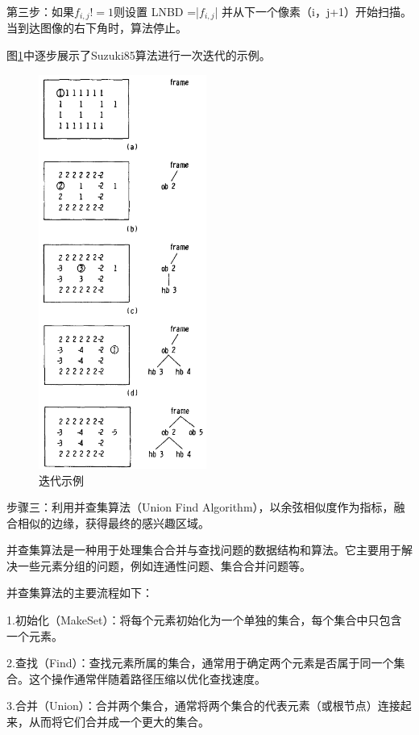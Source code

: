 第三步：如果$f_{i,j}!=1$则设置 LNBD =|$f_{i,j}$| 并从下一个像素（i，j+1）开始扫描。当到达图像的右下角时，算法停止。

图\ref{19}中逐步展示了Suzuki85算法进行一次迭代的示例。
\begin{figure}[ht]
    \centering
    \includegraphics[width=0.49\textwidth]{figures/algorithm_example.png}
    \caption{迭代示例}
    \label{19}
\end{figure}

步骤三：利用并查集算法（Union Find Algorithm），以余弦相似度作为指标，融合相似的边缘，获得最终的感兴趣区域。

并查集算法是一种用于处理集合合并与查找问题的数据结构和算法。它主要用于解决一些元素分组的问题，例如连通性问题、集合合并问题等。

并查集算法的主要流程如下：

1.初始化（MakeSet）：将每个元素初始化为一个单独的集合，每个集合中只包含一个元素。

2.查找（Find）：查找元素所属的集合，通常用于确定两个元素是否属于同一个集合。这个操作通常伴随着路径压缩以优化查找速度。

3.合并（Union）：合并两个集合，通常将两个集合的代表元素（或根节点）连接起来，从而将它们合并成一个更大的集合。

